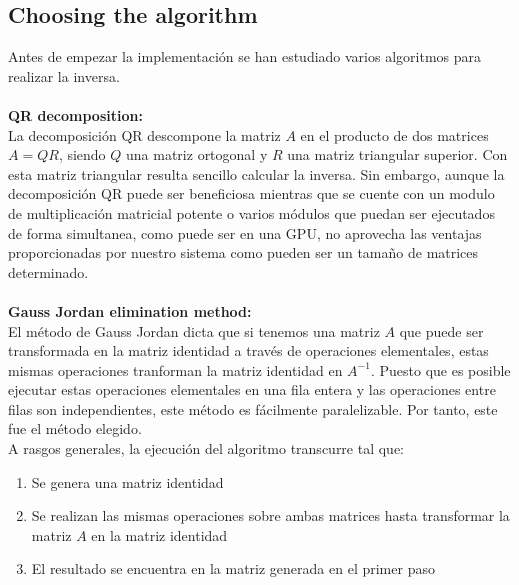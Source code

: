 \subsection{Choosing the algorithm}
Antes de empezar la implementación se han estudiado varios algoritmos para realizar la inversa.
\\
\\
\textbf{QR decomposition:}
\\
La decomposición QR descompone la matriz $A$ en el producto de dos matrices $A = QR$, siendo $Q$ una matriz ortogonal y $R$ una matriz triangular superior. Con esta matriz triangular resulta sencillo calcular la inversa. Sin embargo, aunque la decomposición QR puede ser beneficiosa mientras que se cuente con un modulo de multiplicación matricial potente o varios módulos que puedan ser ejecutados de forma simultanea, como puede ser en una GPU, no aprovecha las ventajas proporcionadas por nuestro sistema como pueden ser un tamaño de matrices determinado.
\\
\\
\textbf{Gauss Jordan elimination method:}
\\
El método de Gauss Jordan dicta que si tenemos una matriz $A$ que puede ser transformada en la matriz identidad a través de operaciones elementales, estas mismas operaciones tranforman la matriz identidad en $A^{-1}$. Puesto que es posible ejecutar estas operaciones elementales en una fila entera y las operaciones entre filas son independientes, este método es fácilmente paralelizable.
Por tanto, este fue el método elegido.
\\
A rasgos generales, la ejecución del algoritmo transcurre tal que:
\begin{enumerate}
\item Se genera una matriz identidad
\item Se realizan las mismas operaciones sobre ambas matrices hasta transformar la matriz $A$ en la matriz identidad
\item El resultado se encuentra en la matriz generada en el primer paso
\end{enumerate}

